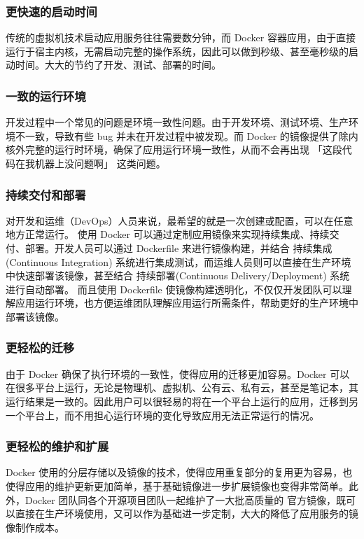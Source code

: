 \documentclass[letterpaper,10pt,english]{sphinxmanual}
\begin{document}
\subsubsection{更快速的启动时间}
\label{\detokenize{docker/intro:id3}}
传统的虚拟机技术启动应用服务往往需要数分钟，而 Docker 容器应用，由于直接运行于宿主内核，无需启动完整的操作系统，因此可以做到秒级、甚至毫秒级的启动时间。大大的节约了开发、测试、部署的时间。


\subsubsection{一致的运行环境}
\label{\detokenize{docker/intro:id4}}
开发过程中一个常见的问题是环境一致性问题。由于开发环境、测试环境、生产环境不一致，导致有些 bug 并未在开发过程中被发现。而 Docker 的镜像提供了除内核外完整的运行时环境，确保了应用运行环境一致性，从而不会再出现 「这段代码在我机器上没问题啊」 这类问题。


\subsubsection{持续交付和部署}
\label{\detokenize{docker/intro:id5}}
对开发和运维（DevOps）人员来说，最希望的就是一次创建或配置，可以在任意地方正常运行。
使用 Docker 可以通过定制应用镜像来实现持续集成、持续交付、部署。开发人员可以通过 Dockerfile 来进行镜像构建，并结合 持续集成(Continuous Integration) 系统进行集成测试，而运维人员则可以直接在生产环境中快速部署该镜像，甚至结合 持续部署(Continuous Delivery/Deployment) 系统进行自动部署。
而且使用 Dockerfile 使镜像构建透明化，不仅仅开发团队可以理解应用运行环境，也方便运维团队理解应用运行所需条件，帮助更好的生产环境中部署该镜像。


\subsubsection{更轻松的迁移}
\label{\detokenize{docker/intro:id6}}
由于 Docker 确保了执行环境的一致性，使得应用的迁移更加容易。Docker 可以在很多平台上运行，无论是物理机、虚拟机、公有云、私有云，甚至是笔记本，其运行结果是一致的。因此用户可以很轻易的将在一个平台上运行的应用，迁移到另一个平台上，而不用担心运行环境的变化导致应用无法正常运行的情况。


\subsubsection{更轻松的维护和扩展}
\label{\detokenize{docker/intro:id7}}
Docker 使用的分层存储以及镜像的技术，使得应用重复部分的复用更为容易，也使得应用的维护更新更加简单，基于基础镜像进一步扩展镜像也变得非常简单。此外，Docker 团队同各个开源项目团队一起维护了一大批高质量的 官方镜像，既可以直接在生产环境使用，又可以作为基础进一步定制，大大的降低了应用服务的镜像制作成本。
\end{document}
